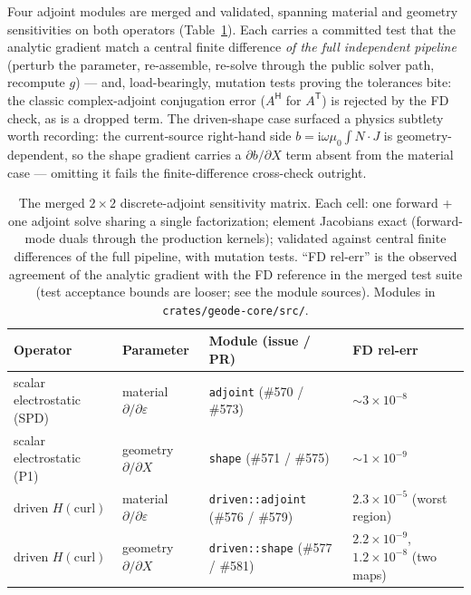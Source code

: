 \documentclass{anvil-paper}
\begin{document}
Four adjoint modules are merged and validated, spanning material and
geometry sensitivities on both operators
(Table~\ref{tab:adjoint-matrix}). Each carries a committed test that the
analytic gradient match a central finite difference \emph{of the full
independent pipeline} (perturb the parameter, re-assemble, re-solve
through the public solver path, recompute $g$) --- and, load-bearingly,
mutation tests proving the tolerances bite: the classic complex-adjoint
conjugation error ($A^{\mathsf{H}}$ for $A^{\mathsf{T}}$) is rejected by
the FD check, as is a dropped term. The driven-shape case surfaced a
physics subtlety worth recording: the current-source right-hand side
$b = \mathrm{i}\omega\mu_0\!\int\! N\cdot J$ is geometry-dependent, so
the shape gradient carries a $\partial b/\partial X$ term absent from the
material case --- omitting it fails the finite-difference cross-check
outright.

\begin{table}[t]
  \centering
  \caption{The merged $2\times 2$ discrete-adjoint sensitivity matrix.
  Each cell: one forward + one adjoint solve sharing a single
  factorization; element Jacobians exact (forward-mode duals through the
  production kernels); validated against central finite differences of
  the full pipeline, with mutation tests. ``FD rel-err'' is the observed
  agreement of the analytic gradient with the FD reference in the merged
  test suite (test acceptance bounds are looser; see the module sources).
  Modules in \texttt{crates/geode-core/src/}.}
  \label{tab:adjoint-matrix}
  \footnotesize
  \setlength{\tabcolsep}{4pt}
  \begin{tabular}{@{}llll@{}}
    \toprule
    Operator & Parameter & Module (issue / PR) & FD rel-err \\
    \midrule
    scalar electrostatic (SPD) & material $\partial/\partial\varepsilon$ &
      \texttt{adjoint} (\#570 / \#573) & ${\sim}3\times10^{-8}$ \\
    scalar electrostatic (P1) & geometry $\partial/\partial X$ &
      \texttt{shape} (\#571 / \#575) & ${\sim}1\times10^{-9}$ \\
    driven $H(\mathrm{curl})$ & material $\partial/\partial\varepsilon$ &
      \texttt{driven::adjoint} (\#576 / \#579) & $2.3\times10^{-5}$ (worst region) \\
    driven $H(\mathrm{curl})$ & geometry $\partial/\partial X$ &
      \texttt{driven::shape} (\#577 / \#581) & $2.2\times10^{-9}$, $1.2\times10^{-8}$ (two maps) \\
    \bottomrule
  \end{tabular}
\end{table}
\end{document}
